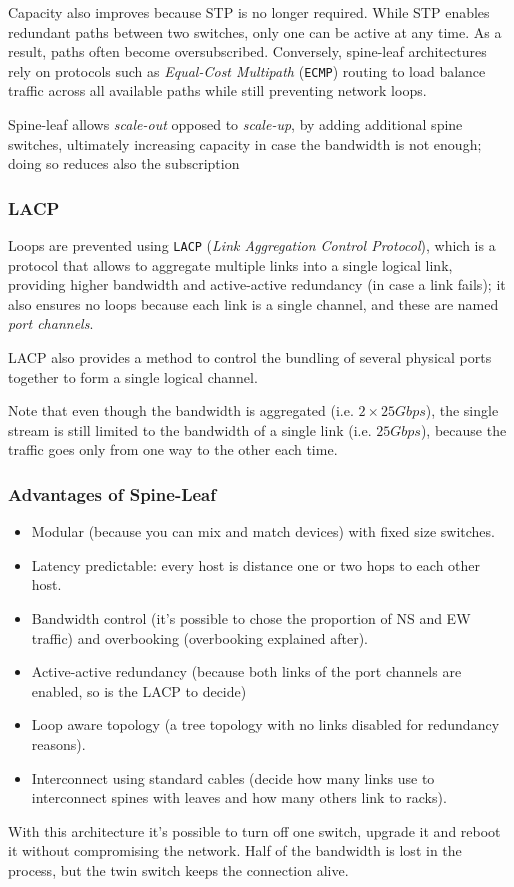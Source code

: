 Capacity also improves because STP is no longer required. While STP enables redundant paths between two switches, only one can be active at any time. As a result, paths often become oversubscribed. 
Conversely, spine-leaf architectures rely on protocols such as \textit{Equal-Cost Multipath} (\texttt{ECMP}) routing to load balance traffic across all available paths while still preventing network loops.

Spine-leaf allows \textit{scale-out} opposed to \textit{scale-up}, by adding additional spine switches, ultimately increasing capacity in case the bandwidth is not enough; doing so reduces also the subscription

\subsubsection{LACP}
Loops are prevented using \texttt{LACP} (\textit{Link Aggregation Control Protocol}), which is a protocol that allows to aggregate multiple links into a single logical link, providing higher bandwidth and active-active redundancy (in case a link fails);
it also ensures no loops because each link is a single channel, and these are named \textit{port channels}.

LACP also provides a method to control the bundling of several physical ports together to form a single logical channel.

Note that even though the bandwidth is aggregated (i.e. $2\times 25Gbps$), the single stream is still limited to the bandwidth of a single link (i.e. $25Gbps$), because the traffic goes only from one way to the other each time.

\subsubsection{Advantages of Spine-Leaf}

\begin{itemize}
   \item Modular (because you can mix and match devices) with fixed size switches.
   \item Latency predictable: every host is distance one or two hops to each other host.
   \item Bandwidth control (it's possible to chose the proportion of NS and EW traffic) and overbooking (overbooking explained after).
   \item Active-active redundancy (because both links of the port channels are enabled, so is the LACP to decide)
   \item Loop aware topology (a tree topology with no links disabled for redundancy reasons).
   \item Interconnect using standard cables (decide how many links use to interconnect spines with leaves and how many others link to racks).
   
\end{itemize}
With this architecture it’s possible to turn off one switch, upgrade it and reboot it without compromising the network. Half of the bandwidth is lost in the process, but the twin switch keeps the connection alive.

